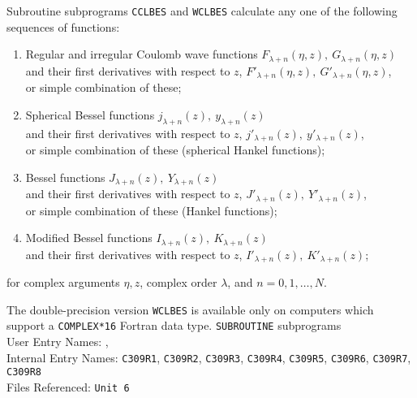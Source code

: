                        
  
              
                    
Subroutine subprograms {\tt CCLBES} and {\tt WCLBES} calculate any
one of the following
sequences of functions:
\begin{enumerate}
\item  Regular and irregular Coulomb wave functions
$F_{\lambda+n}(\eta,z), \ G_{\lambda+n}(\eta,z)$ \\
and their first derivatives with respect to $z$,
$F'_{\lambda+n} (\eta,z), \ G'_{\lambda+n}(\eta,z)$, \\
or simple combination of these;
\item  Spherical Bessel functions
$j_{\lambda+n}(z), \ y_{\lambda+n}(z)$ \\
and their first derivatives with respect to $z$,
$j'_{\lambda +n}(z), \ y'_{\lambda +n}(z)$, \\
or simple combination of these (spherical Hankel functions);
\item  Bessel functions $J_{\lambda +n}(z), \ Y_{\lambda+n}(z)$ \\
and their first derivatives with respect to $z$,
$J'_{\lambda+n}(z), \ Y'_{\lambda+n}(z)$, \\
or simple combination  of these (Hankel functions);
\item Modified Bessel functions
$I_{\lambda+n}(z), \ K_{\lambda+n}(z)$ \\
and their  first derivatives with respect to $z$,
$I'_{\lambda+n}(z), \ K'_{\lambda+n}(z)$;
\end{enumerate}
\par
for complex arguments $\eta,z$, complex order
$\lambda$, and $ n=0,1,\ldots,N.$
\par
The double-precision version {\tt WCLBES} is available only
on computers which support a {\tt COMPLEX*16} Fortran data type.
\Structure
{\tt SUBROUTINE} subprograms\\
User Entry Names: ,  \\
Internal   Entry Names:
{\tt C309R1}, {\tt C309R2}, {\tt C309R3}, {\tt C309R4}, {\tt C309R5},
{\tt C309R6}, {\tt C309R7}, {\tt C309R8} \\
Files Referenced: {\tt Unit 6} \\
